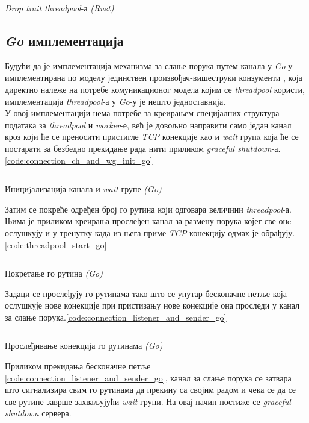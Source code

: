 \begin{listing}[H]
\inputminted{rust}{kodovi/threadpool_drop.rs}
\caption{\textit{Drop trait threadpool}-а \textit{(Rust)}}
\label{code:threadpool_drop_rust}
\end{listing}

\subsection{\textit{Go} имплементација}

Будући да је имплементација механизма за слање порука путем канала у \textit{Go}-у имплементирана по моделу јединствен произвођач-вишеструки конзументи , која директно належе на потребе комуникационог модела којим се \textit{threadpool} користи, имплементација \textit{threadpool}-а у \textit{Go}-у је нешто једноставнија.\\

У овој имплементацији нема потребе за креирањем специјалних структура података за \textit{threadpool} и \textit{worker}-е, већ је довољно направити само један канал кроз који ће се преносити пристигле \textit{TCP} конекције као и \textit{wait} групa која ће се постарати за безбедно прекидање рада нити приликом \textit{graceful shutdown}-а. \ref{code:connection_ch_and_wg_init_go}\\

\begin{listing}[H]
\inputminted{go}{kodovi/connection_ch_and_wg_init.go}
\caption{Инициjализација канала и \textit{wait} групе  \textit{(Go)}}
\label{code:connection_ch_and_wg_init_go}
\end{listing}

Затим се покреће одређен број го рутина који одговара величини \textit{threadpool}-а. Њима је приликом креирања прослеђен канал за размену порука којег све онe ослушкују и у тренутку када из њега приме \textit{TCP} конекцију одмах је обрађују.\ref{code:threadpool_start_go}\\

\begin{listing}[H]
\inputminted{go}{kodovi/threadpool_start.go}
\caption{Покретање го рутина  \textit{(Go)}}
\label{code:threadpool_start_go}
\end{listing}

Задаци се прослеђују го рутинама тако што се унутар бесконачне петље која ослушкује нове конекције при пристизању нове конекције она проследи у канал за слање порука.\ref{code:connection_listener_and_sender_go} \\

\begin{listing}[H]
\inputminted{go}{kodovi/connection_listener_and_sender.go}
\caption{Прослеђивање конекција го рутинама  \textit{(Go)}}
\label{code:connection_listener_and_sender_go}
\end{listing}

Приликом прекидања бесконачне петље \ref{code:connection_listener_and_sender_go}, канал за слање порука се затвара што сигнализира свим го рутинама да прекину са својим радом и чека се да се све рутине заврше захваљујући \textit{wait} групи. На овај начин постиже се \textit{graceful shutdown} сервера.